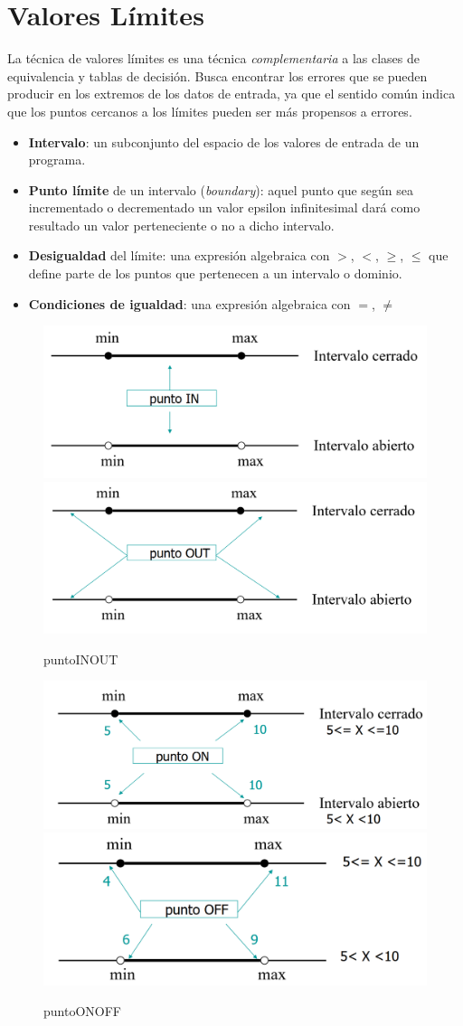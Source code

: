 \section{Valores Límites}
La técnica de valores límites es una técnica \textit{complementaria} a las clases de equivalencia y tablas de decisión.
Busca encontrar los errores que se pueden producir en los extremos de los datos de entrada, ya que el sentido común indica que los puntos cercanos a los límites pueden ser más propensos a errores.
\begin{itemize}
	\item \textbf{Intervalo}: un subconjunto del espacio de los valores de entrada de
un programa.
	\item \textbf{Punto límite} de un intervalo (\textit{boundary}): aquel punto que según
sea incrementado o decrementado un valor epsilon infinitesimal
dará como resultado un valor perteneciente o no a dicho intervalo.
	\item \textbf{Desigualdad} del límite: una expresión algebraica con $>$, $<$, $\geq$, $\leq$
que define parte de los puntos que pertenecen a un intervalo o
dominio.
	\item \textbf{Condiciones de igualdad}: una expresión algebraica con $=$, $\neq$
\end{itemize}

\begin{figure}[htbp]
   \centering
   \includegraphics[width=0.45\columnwidth]{images/05/puntoIN.png}
   \includegraphics[width=0.45\columnwidth]{images/05/puntoOUT.png}
   \caption{puntoINOUT}
   \label{fig:05/puntoINOUT}
\end{figure}
\begin{figure}[htbp]
   \centering
   \includegraphics[width=0.45\columnwidth]{images/05/puntoON.png}
   \includegraphics[width=0.45\columnwidth]{images/05/puntoOFF.png}
   \caption{puntoONOFF}
   \label{fig:05/puntoONOFF}
\end{figure}

